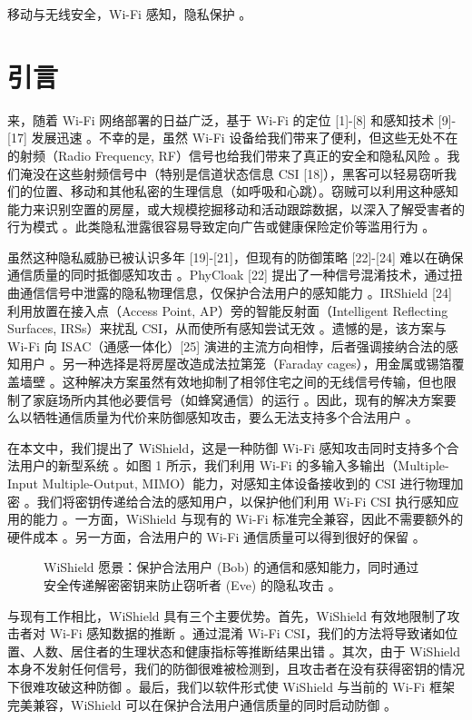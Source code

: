 \documentclass[journal]{IEEEtran}
\begin{document}
\begin{IEEEkeywords}
移动与无线安全，Wi-Fi 感知，隐私保护 。
\end{IEEEkeywords}

\section{引言}
来，随着 Wi-Fi 网络部署的日益广泛，基于 Wi-Fi 的定位 [1]-[8] 和感知技术 [9]-[17] 发展迅速 。不幸的是，虽然 Wi-Fi 设备给我们带来了便利，但这些无处不在的射频（Radio Frequency, RF）信号也给我们带来了真正的安全和隐私风险 。我们淹没在这些射频信号中（特别是信道状态信息 CSI [18]），黑客可以轻易窃听我们的位置、移动和其他私密的生理信息（如呼吸和心跳）。窃贼可以利用这种感知能力来识别空置的房屋，或大规模挖掘移动和活动跟踪数据，以深入了解受害者的行为模式 。此类隐私泄露很容易导致定向广告或健康保险定价等滥用行为 。

虽然这种隐私威胁已被认识多年 [19]-[21]，但现有的防御策略 [22]-[24] 难以在确保通信质量的同时抵御感知攻击 。PhyCloak [22] 提出了一种信号混淆技术，通过扭曲通信信号中泄露的隐私物理信息，仅保护合法用户的感知能力 。IRShield [24] 利用放置在接入点（Access Point, AP）旁的智能反射面（Intelligent Reflecting Surfaces, IRSs）来扰乱 CSI，从而使所有感知尝试无效 。遗憾的是，该方案与 Wi-Fi 向 ISAC（通感一体化）[25] 演进的主流方向相悖，后者强调接纳合法的感知用户 。另一种选择是将房屋改造成法拉第笼（Faraday cages），用金属或锡箔覆盖墙壁 。这种解决方案虽然有效地抑制了相邻住宅之间的无线信号传输，但也限制了家庭场所内其他必要信号（如蜂窝通信）的运行 。因此，现有的解决方案要么以牺牲通信质量为代价来防御感知攻击，要么无法支持多个合法用户 。

在本文中，我们提出了 WiShield，这是一种防御 Wi-Fi 感知攻击同时支持多个合法用户的新型系统 。如图 1 所示，我们利用 Wi-Fi 的多输入多输出（Multiple-Input Multiple-Output, MIMO）能力，对感知主体设备接收到的 CSI 进行物理加密 。我们将密钥传递给合法的感知用户，以保护他们利用 Wi-Fi CSI 执行感知应用的能力 。一方面，WiShield 与现有的 Wi-Fi 标准完全兼容，因此不需要额外的硬件成本 。另一方面，合法用户的 Wi-Fi 通信质量可以得到很好的保留 。

\begin{figure}[htbp]
\centering
\caption{WiShield 愿景：保护合法用户 (Bob) 的通信和感知能力，同时通过安全传递解密密钥来防止窃听者 (Eve) 的隐私攻击 。}
\label{fig:vision}
\end{figure}

与现有工作相比，WiShield 具有三个主要优势。首先，WiShield 有效地限制了攻击者对 Wi-Fi 感知数据的推断 。通过混淆 Wi-Fi CSI，我们的方法将导致诸如位置、人数、居住者的生理状态和健康指标等推断结果出错 。其次，由于 WiShield 本身不发射任何信号，我们的防御很难被检测到，且攻击者在没有获得密钥的情况下很难攻破这种防御 。最后，我们以软件形式使 WiShield 与当前的 Wi-Fi 框架完美兼容，WiShield 可以在保护合法用户通信质量的同时启动防御 。
\end{document}

